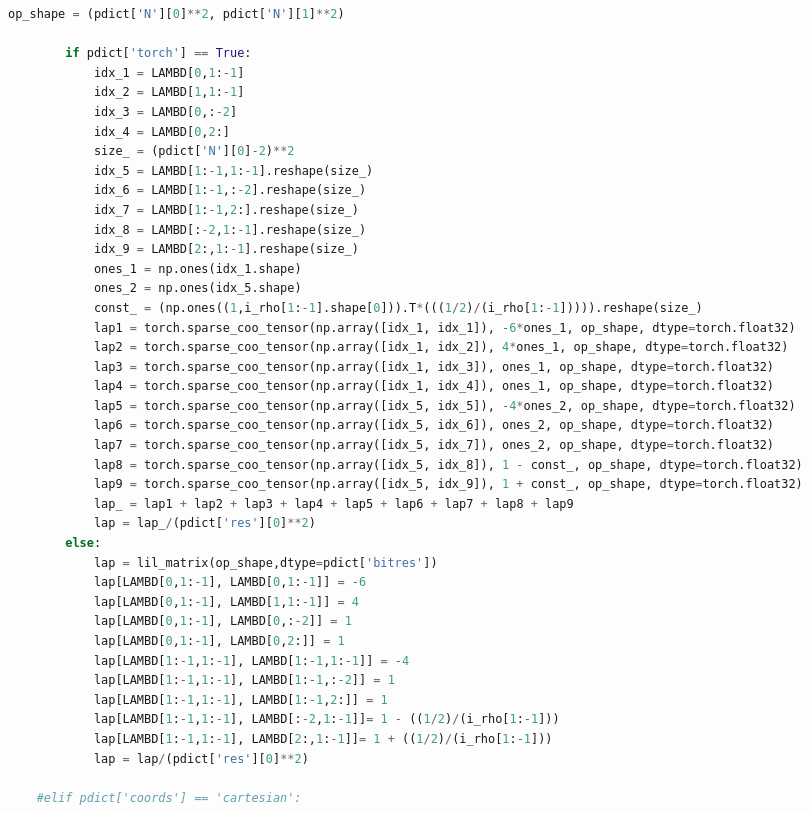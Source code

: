 \begin{spacing}{1}
\begin{lstlisting}[frame=single, language=Python]
        op_shape = (pdict['N'][0]**2, pdict['N'][1]**2)
        
        if pdict['torch'] == True:
            idx_1 = LAMBD[0,1:-1]
            idx_2 = LAMBD[1,1:-1]
            idx_3 = LAMBD[0,:-2]
            idx_4 = LAMBD[0,2:]
            size_ = (pdict['N'][0]-2)**2
            idx_5 = LAMBD[1:-1,1:-1].reshape(size_)
            idx_6 = LAMBD[1:-1,:-2].reshape(size_)
            idx_7 = LAMBD[1:-1,2:].reshape(size_)
            idx_8 = LAMBD[:-2,1:-1].reshape(size_)
            idx_9 = LAMBD[2:,1:-1].reshape(size_)
            ones_1 = np.ones(idx_1.shape)
            ones_2 = np.ones(idx_5.shape)
            const_ = (np.ones((1,i_rho[1:-1].shape[0])).T*(((1/2)/(i_rho[1:-1])))).reshape(size_)
            lap1 = torch.sparse_coo_tensor(np.array([idx_1, idx_1]), -6*ones_1, op_shape, dtype=torch.float32)
            lap2 = torch.sparse_coo_tensor(np.array([idx_1, idx_2]), 4*ones_1, op_shape, dtype=torch.float32)
            lap3 = torch.sparse_coo_tensor(np.array([idx_1, idx_3]), ones_1, op_shape, dtype=torch.float32)
            lap4 = torch.sparse_coo_tensor(np.array([idx_1, idx_4]), ones_1, op_shape, dtype=torch.float32)
            lap5 = torch.sparse_coo_tensor(np.array([idx_5, idx_5]), -4*ones_2, op_shape, dtype=torch.float32)
            lap6 = torch.sparse_coo_tensor(np.array([idx_5, idx_6]), ones_2, op_shape, dtype=torch.float32)
            lap7 = torch.sparse_coo_tensor(np.array([idx_5, idx_7]), ones_2, op_shape, dtype=torch.float32)
            lap8 = torch.sparse_coo_tensor(np.array([idx_5, idx_8]), 1 - const_, op_shape, dtype=torch.float32)
            lap9 = torch.sparse_coo_tensor(np.array([idx_5, idx_9]), 1 + const_, op_shape, dtype=torch.float32)
            lap_ = lap1 + lap2 + lap3 + lap4 + lap5 + lap6 + lap7 + lap8 + lap9
            lap = lap_/(pdict['res'][0]**2)  
        else:
            lap = lil_matrix(op_shape,dtype=pdict['bitres'])
            lap[LAMBD[0,1:-1], LAMBD[0,1:-1]] = -6
            lap[LAMBD[0,1:-1], LAMBD[1,1:-1]] = 4
            lap[LAMBD[0,1:-1], LAMBD[0,:-2]] = 1
            lap[LAMBD[0,1:-1], LAMBD[0,2:]] = 1
            lap[LAMBD[1:-1,1:-1], LAMBD[1:-1,1:-1]] = -4
            lap[LAMBD[1:-1,1:-1], LAMBD[1:-1,:-2]] = 1
            lap[LAMBD[1:-1,1:-1], LAMBD[1:-1,2:]] = 1
            lap[LAMBD[1:-1,1:-1], LAMBD[:-2,1:-1]]= 1 - ((1/2)/(i_rho[1:-1]))
            lap[LAMBD[1:-1,1:-1], LAMBD[2:,1:-1]]= 1 + ((1/2)/(i_rho[1:-1]))
            lap = lap/(pdict['res'][0]**2)
        
    #elif pdict['coords'] == 'cartesian':
        

\end{lstlisting}
\end{spacing}
